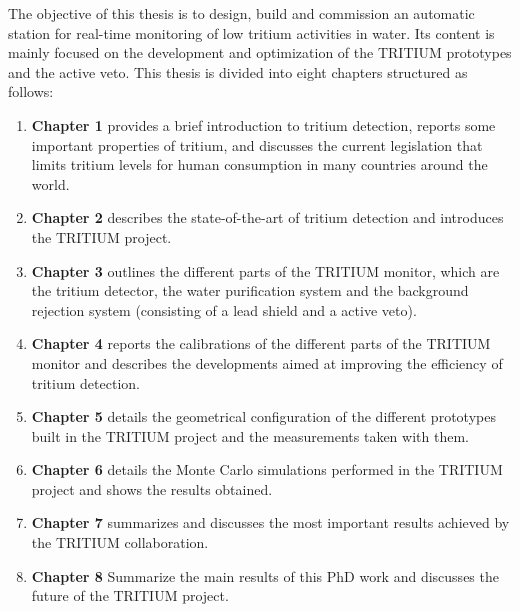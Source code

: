The objective of this thesis is to design, build and commission an automatic station for real-time monitoring of low tritium activities in water. Its content is mainly focused on the development and optimization of the TRITIUM prototypes and the active veto. This thesis is divided into eight chapters structured as follows:

\begin{enumerate}
\item{} \textbf{Chapter 1} provides a brief introduction to tritium detection, reports some important properties of tritium, and discusses the current legislation that limits tritium levels for human consumption in many countries around the world. 

\item{} \textbf{Chapter 2} describes the state-of-the-art of tritium detection and introduces the TRITIUM project. 

\item{} \textbf{Chapter 3} outlines the different parts of the TRITIUM monitor, which are the tritium detector, the water purification system and the background rejection system (consisting of a lead shield and a active veto). 

\item{} \textbf{Chapter 4} reports the calibrations of the different parts of the TRITIUM monitor and describes the developments aimed at improving the efficiency of tritium detection. 

\item{} \textbf{Chapter 5} details the geometrical configuration of the different prototypes built in the TRITIUM project and the measurements taken with them. 

\item{} \textbf{Chapter 6} details the Monte Carlo simulations performed in the TRITIUM project and shows the results obtained. 

\item{} \textbf{Chapter 7} summarizes and discusses the most important results achieved by the TRITIUM collaboration.

\item{} \textbf{Chapter 8} Summarize the main results of this PhD work and discusses the future of the TRITIUM project.

\end{enumerate}

